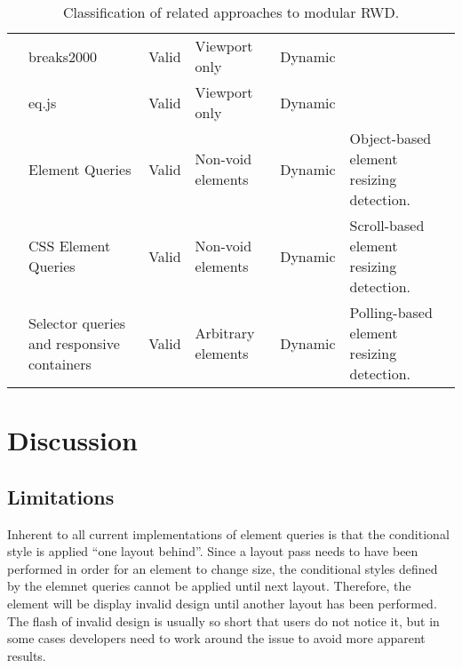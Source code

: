 \documentclass{acm_proc_article-sp}
\newcommand{\elq}{ELQ}
\begin{document}
\begin{table*}[ht!]
\begin{tabular}[t]{ l p{3cm} l l l p{3cm} }
      \cite{eq_imp_breaks2000} &            breaks2000 &                                  Valid &     Viewport only &              Dynamic &   \\
      \cite{eq_imp_eqjs} &                  eq.js &                                       Valid &     Viewport only &              Dynamic &   \\
      \cite{eq_imp_element-queries} &       Element Queries &                             Valid &     Non-void elements &   Dynamic &   Object-based element resizing detection. \\
      \cite{eq_imp_css-element-queries} &   CSS Element Queries &                         Valid &     Non-void elements &   Dynamic &   Scroll-based element resizing detection. \\
      \cite{eq_imp_selector_queries} &      Selector queries and responsive containers &  Valid &     Arbitrary elements &  Dynamic &   Polling-based element resizing detection. \\
    \end{tabular}
    \caption{Classification of related approaches to modular RWD.}
    \label{table:approaches-classifications}
  \end{table*}

\section{Discussion}\label{sec:discussion}

  \subsection{Limitations}
    Inherent to all current implementations of element queries is that the conditional style is applied ``one layout behind''.
    Since a layout pass needs to have been performed in order for an element to change size, the conditional styles defined by the elemnet queries cannot be applied until next layout.
    Therefore, the element will be display invalid design until another layout has been performed.
    The flash of invalid design is usually so short that users do not notice it, but in some cases developers need to work around the issue to avoid more apparent results.
\end{document}
